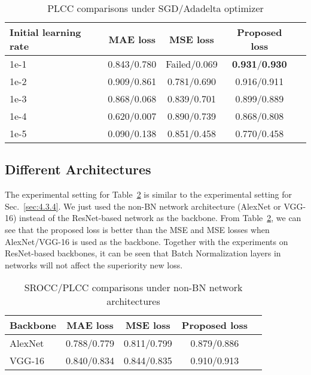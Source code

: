 \documentclass[sigconf]{acmart}
\begin{document}
\begin{table}[!htb]
\centering
\caption{PLCC comparisons under SGD/Adadelta optimizer}
\label{tab:optimizer}
\begin{tabular}{lcccc}  
\toprule
Initial learning rate & MAE loss & MSE loss & Proposed loss \\
\midrule
1e-1 & 0.843/0.780 & Failed/0.069 & \textbf{0.931}/\textbf{0.930} \\
1e-2 & 0.909/0.861 & 0.781/0.690 & 0.916/0.911 \\
1e-3 & 0.868/0.068 & 0.839/0.701 & 0.899/0.889 \\
1e-4 & 0.620/0.007 & 0.890/0.739 & 0.868/0.808 \\
1e-5 & 0.090/0.138 & 0.851/0.458 & 0.770/0.458 \\
\bottomrule
\end{tabular}
\end{table}

\subsection{Different Architectures}
\label{sec:supp_e}
The experimental setting for Table~\ref{tab:architecture} is similar to the experimental setting for Sec.~\ref{sec:4.3.4}. We just used the non-BN network architecture (AlexNet or VGG-16) instead of the ResNet-based network as the backbone. 
From Table~\ref{tab:architecture}, we can see that the proposed loss is better than the MSE and MSE losses when AlexNet/VGG-16 is used as the backbone. 
Together with the experiments on ResNet-based backbones, it can be seen that Batch Normalization layers in networks will not affect the superiority new loss.

\begin{table}[!htb]
\centering
\caption{SROCC/PLCC comparisons under non-BN network architectures}
\label{tab:architecture}
\begin{tabular}{lcccc}  
\toprule
Backbone & MAE loss & MSE loss & Proposed loss \\
\midrule
AlexNet & 0.788/0.779 & 0.811/0.799 & 0.879/0.886 \\
VGG-16 & 0.840/0.834 & 0.844/0.835 & 0.910/0.913 \\
\bottomrule
\end{tabular}
\end{table}
\end{document}
